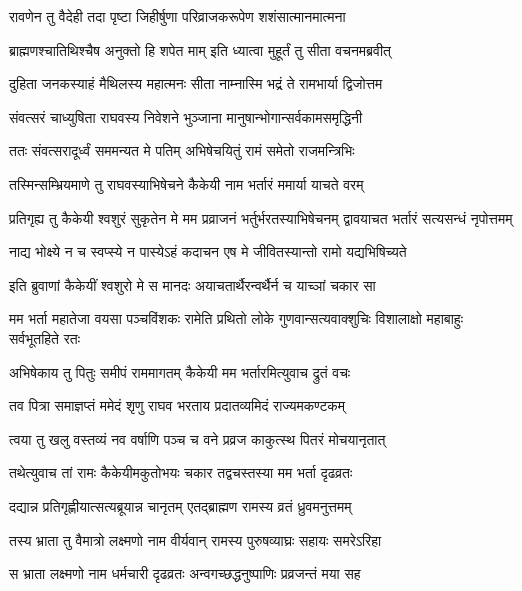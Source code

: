 
\twolineshloka
{रावणेन तु वैदेही तदा पृष्टा जिहीर्षुणा}
{परिव्राजकरूपेण शशंसात्मानमात्मना} %

\twolineshloka
{ब्राह्मणश्चातिथिश्चैष अनुक्तो हि शपेत माम्}
{इति ध्यात्वा मुहूर्तं तु सीता वचनमब्रवीत्} %

\twolineshloka
{दुहिता जनकस्याहं मैथिलस्य महात्मनः}
{सीता नाम्नास्मि भद्रं ते रामभार्या द्विजोत्तम} %

\twolineshloka
{संवत्सरं चाध्युषिता राघवस्य निवेशने}
{भुञ्जाना मानुषान्भोगान्सर्वकामसमृद्धिनी} %

\twolineshloka
{ततः संवत्सरादूर्ध्वं सममन्यत मे पतिम्}
{अभिषेचयितुं रामं समेतो राजमन्त्रिभिः} %

\twolineshloka
{तस्मिन्सम्भ्रियमाणे तु राघवस्याभिषेचने}
{कैकेयी नाम भर्तारं ममार्या याचते वरम्} %

\threelineshloka
{प्रतिगृह्य तु कैकेयी श्वशुरं सुकृतेन मे}
{मम प्रव्राजनं भर्तुर्भरतस्याभिषेचनम्}
{द्वावयाचत भर्तारं सत्यसन्धं नृपोत्तमम्} %

\twolineshloka
{नाद्य भोक्ष्ये न च स्वप्स्ये न पास्येऽहं कदाचन}
{एष मे जीवितस्यान्तो रामो यद्यभिषिच्यते} %

\twolineshloka
{इति ब्रुवाणां कैकेयीं श्वशुरो मे स मानदः}
{अयाचतार्थैरन्वर्थैर्न च याच्ञां चकार सा} %

\threelineshloka
{मम भर्ता महातेजा वयसा पञ्चविंशकः}
{रामेति प्रथितो लोके गुणवान्सत्यवाक्शुचिः}
{विशालाक्षो महाबाहुः सर्वभूतहिते रतः} %

\twolineshloka
{अभिषेकाय तु पितुः समीपं राममागतम्}
{कैकेयी मम भर्तारमित्युवाच द्रुतं वचः} %

\twolineshloka
{तव पित्रा समाज्ञप्तं ममेदं शृणु राघव}
{भरताय प्रदातव्यमिदं राज्यमकण्टकम्} %

\twolineshloka
{त्वया तु खलु वस्तव्यं नव वर्षाणि पञ्च च}
{वने प्रव्रज काकुत्स्थ पितरं मोचयानृतात्} %

\twolineshloka
{तथेत्युवाच तां रामः कैकेयीमकुतोभयः}
{चकार तद्वचस्तस्या मम भर्ता दृढव्रतः} %

\twolineshloka
{दद्यान्न प्रतिगृह्णीयात्सत्यब्रूयान्न चानृतम्}
{एतद्ब्राह्मण रामस्य व्रतं ध्रुवमनुत्तमम्} %

\twolineshloka
{तस्य भ्राता तु वैमात्रो लक्ष्मणो नाम वीर्यवान्}
{रामस्य पुरुषव्याघ्रः सहायः समरेऽरिहा} %

\twolineshloka
{स भ्राता लक्ष्मणो नाम धर्मचारी दृढव्रतः}
{अन्वगच्छद्धनुष्पाणिः प्रव्रजन्तं मया सह} %

